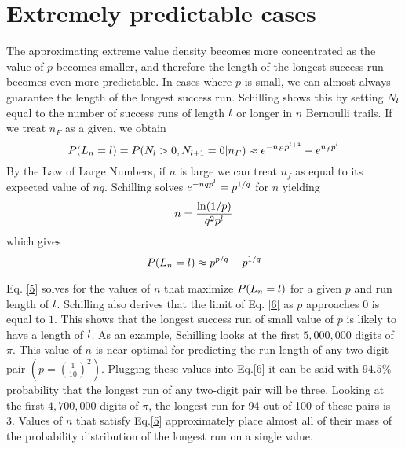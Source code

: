 \documentclass{article}
\begin{document}
\section{Extremely predictable cases}
The approximating extreme value density becomes more concentrated as the value of $p$ becomes smaller, and therefore the length of the longest success run becomes even more predictable. In cases where $p$ is small, we can almost always guarantee the length of the longest success run. Schilling shows this by setting $N_\mathnormal{l}$ equal to the number of success runs of length $\mathnormal{l}$ or longer in $n$ Bernoulli trails. If we treat $n_F$ as a given, we obtain
\[ P(L_n=\mathnormal{l})=P(N_\mathnormal{l} > 0, N_{\mathnormal{l}+1}=0|n_F) \approx e^{-n_Fp^{\mathnormal{l}+1}} - e^{n_fp^\mathnormal{l}}\]
By the Law of Large Numbers, if $n$ is large we can treat $n_f$ as equal to its expected value of $nq$. Schilling solves  $e^{-nqp^\mathnormal{l}}=p^{1/q}$ for $n$ yielding
\begin{equation}\label{5}
    n = \frac{\ln(1/p)}{q^2p^\mathnormal{l}}
\end{equation}
which gives
\begin{equation}\label{6}
    P(L_n=\mathnormal{l}) \approx p^{p/q}-p^{1/q}
\end{equation}

Eq. \ref{5} solves for the values of $n$ that maximize $P(L_n=\mathnormal{l})$ for a given $p$ and run length of $\mathnormal{l}$. Schilling also derives that the limit of Eq. \ref{6} as $p$ approaches $0$ is equal to $1$. This shows that the longest success run of small value of $p$ is likely to have a length of $\mathnormal{l}$. As an example, Schilling looks at the first $5,000,000$ digits of $\pi$. This value of $n$ is near optimal for predicting the run length of any two digit pair $\left(p=\left(\frac{1}{10}\right)^2\right)$. Plugging these values into Eq.\ref{6} it can be said with $94.5\%$ probability that the longest run of any two-digit pair will be three. Looking at the first $4,700,000$ digits of $\pi$, the longest run for 94 out of 100 of these pairs is 3. Values of $n$ that satisfy Eq.\ref{5} approximately place almost all of their mass of the probability distribution of the longest run on a single value. 
\nocite{*}
\printbibliography
\end{document}

